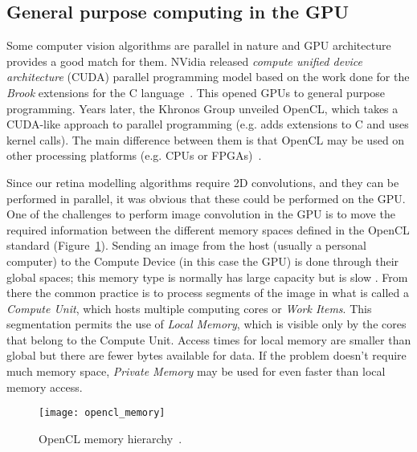 

\subsection{General purpose computing in the GPU}

Some computer vision algorithms are parallel in nature and GPU architecture provides a good match for them. NVidia released \emph{compute unified device architecture} (CUDA) parallel programming model based on the work done for the \emph{Brook} extensions for the C language~\cite{buck2004brook,cuda}. This opened GPUs to general purpose programming. Years later, the Khronos Group unveiled OpenCL, which takes a CUDA-like approach to parallel programming (e.g. adds extensions to C and uses kernel calls). The main difference between them is that OpenCL may be used on other processing platforms (e.g. CPUs or FPGAs)~\cite{opencl}.

Since our retina modelling algorithms require 2D convolutions, and they can be performed in parallel, it was obvious that these could be performed on the GPU. One of the challenges to perform image convolution in the GPU is to move the required information between the different memory spaces defined in the OpenCL standard (Figure~\ref{fig:c2s:opencl-mem}). Sending an image from the host (usually a personal computer) to the Compute Device (in this case the GPU) is done through their global spaces; this memory type is normally has large capacity but is slow . From there the common practice is to process segments of the image in what is called a \emph{Compute Unit}, which hosts multiple computing cores or \emph{Work Items}. This segmentation permits the use of \emph{Local Memory}, which is visible only by the cores that belong to the Compute Unit. Access times for local memory are smaller than global but there are fewer bytes available for data. If the problem doesn't require much memory space, \emph{Private Memory} may be used for even faster than local memory access.

\begin{figure}[h]
  \begin{center}
    \texttt{[image: opencl\_memory]}
    \caption{OpenCL memory hierarchy~\cite{opencl}.}
    \label{fig:c2s:opencl-mem}
  \end{center}
\end{figure}

